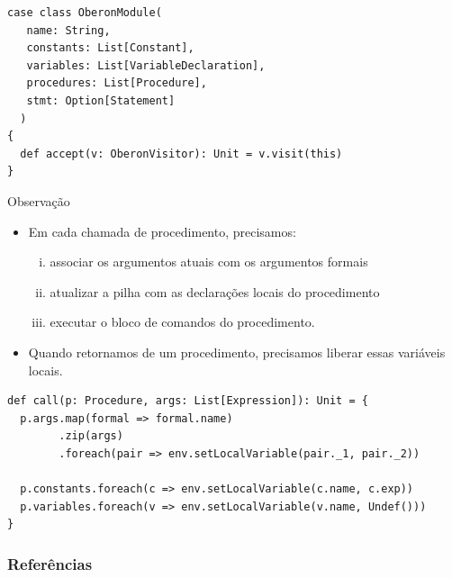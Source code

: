 \documentclass{beamer}
\begin{document}
\begin{frame}[fragile]
\begin{scriptsize}  
  \begin{lstlisting}
case class OberonModule(
   name: String,
   constants: List[Constant],
   variables: List[VariableDeclaration],
   procedures: List[Procedure],
   stmt: Option[Statement]
  )
{
  def accept(v: OberonVisitor): Unit = v.visit(this)
}
  \end{lstlisting}
\end{scriptsize}  
\end{frame}


\begin{frame}
  \begin{block}{Observa\c c\~{a}o}
   \begin{itemize}
   \item Em cada chamada de procedimento, precisamos:
     \begin{enumerate}[(i)]
      \item associar os argumentos atuais com os argumentos formais \faStar
      \item atualizar a pilha com as declara\c c\~{o}es locais do procedimento
      \item executar o bloco de comandos do procedimento. \pause
     \end{enumerate}   
    \item  Quando retornamos de um procedimento, precisamos {\color{blue}liberar}
     essas vari\'{a}veis locais.  
  \end{itemize}
 \end{block} 
\end{frame}

\begin{frame}[fragile]
  \begin{scriptsize}
    \begin{lstlisting}
def call(p: Procedure, args: List[Expression]): Unit = {
  p.args.map(formal => formal.name)
        .zip(args)
        .foreach(pair => env.setLocalVariable(pair._1, pair._2))

  p.constants.foreach(c => env.setLocalVariable(c.name, c.exp))
  p.variables.foreach(v => env.setLocalVariable(v.name, Undef()))
}
    \end{lstlisting}  
  \end{scriptsize}
\end{frame}

\begin{frame}[t, allowframebreaks]
  \frametitle{Refer\^{e}ncias}
  
 
\end{frame}

\begin{frame}
\titlepage
\end{frame}
\end{document}
